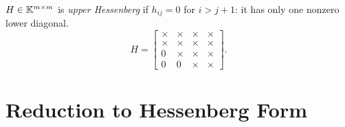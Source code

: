 \begin{definition}
  \label{def:hessenberg}
  $H \in \mathbb{K}^{m \times m}$ is \emph{upper Hessenberg} if $h_{ij} = 0$ for $i > j + 1$: it has only one nonzero lower diagonal.
  \begin{equation}
    H = \begin{bmatrix} \times & \times & \times & \times \\ \times & \times & \times & \times \\ 0 & \times & \times & \times \\ 0 & 0 & \times & \times \end{bmatrix}.
  \end{equation}
\end{definition}

\section{Reduction to Hessenberg Form}
\label{sec:hessenberg}

